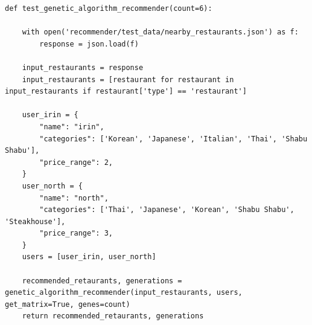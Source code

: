 \documentclass[12pt,oneside,openright,a4paper]{cpe-english-project}
\begin{document}
\begin{lstlisting}
def test_genetic_algorithm_recommender(count=6):

    with open('recommender/test_data/nearby_restaurants.json') as f:
        response = json.load(f)

    input_restaurants = response
    input_restaurants = [restaurant for restaurant in input_restaurants if restaurant['type'] == 'restaurant']

    user_irin = {
        "name": "irin",
        "categories": ['Korean', 'Japanese', 'Italian', 'Thai', 'Shabu Shabu'],
        "price_range": 2,
    }
    user_north = {
        "name": "north",
        "categories": ['Thai', 'Japanese', 'Korean', 'Shabu Shabu', 'Steakhouse'],
        "price_range": 3,
    }
    users = [user_irin, user_north]
    
    recommended_retaurants, generations = genetic_algorithm_recommender(input_restaurants, users, get_matrix=True, genes=count)
    return recommended_retaurants, generations
\end{lstlisting}
\end{document}
